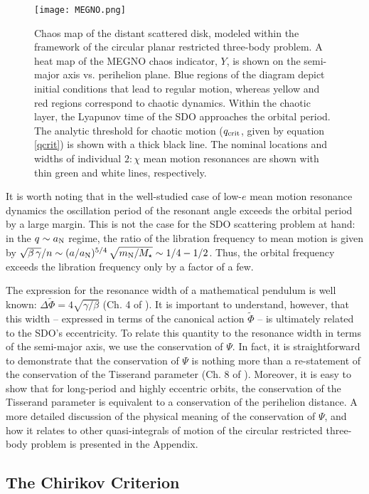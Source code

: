 \documentclass[twocolumn]{aastex62}
\newcommand{\M}{M_{\star}}
\newcommand{\mn}{m_{\rm{N}}}
\newcommand{\an}{a_{\rm{N}}}
\begin{document}
\begin{figure*}[t]
\centering
\texttt{[image: MEGNO.png]}
\caption{Chaos map of the distant scattered disk, modeled within the framework of the circular planar restricted three-body problem. A heat map of the MEGNO chaos indicator, $Y$, is shown on the semi-major axis vs. perihelion plane. Blue regions of the diagram depict initial conditions that lead to regular motion, whereas yellow and red regions correspond to chaotic dynamics. Within the chaotic layer, the Lyapunov time of the SDO approaches the orbital period. The analytic threshold for chaotic motion ($q_{\rm{crit}}$, given by equation \ref{qcrit}) is shown with a thick black line. The nominal locations and widths of individual $2:\chi$ mean motion resonances are shown with thin green and white lines, respectively.}
\label{Fig:MEGNO}
\end{figure*}

It is worth noting that in the well-studied case of low-$e$ mean motion resonance dynamics \citep{MD99,Morbybook} the oscillation period of the resonant angle exceeds the orbital period by a large margin. This is not the case for the SDO scattering problem at hand: in the $q\sim \an$ regime, the ratio of the libration frequency to mean motion is given by $\sqrt{\beta\,\gamma}/n\sim (a/\an)^{5/4}\,\sqrt{\mn/\M}\sim1/4-1/2$. Thus, the orbital frequency exceeds the libration frequency only by a factor of a few.

The expression for the resonance width of a mathematical pendulum is well known: $\Delta\tilde{\Phi}=4\sqrt{\gamma/\beta}$ (Ch. 4 of \citealt{Morbybook}). It is important to understand, however, that this width -- expressed in terms of the canonical action $\tilde{\Phi}$ -- is ultimately related to the SDO's eccentricity. To relate this quantity to the resonance width in terms of the semi-major axis, we use the conservation of $\Psi$. In fact, it is straightforward to demonstrate that the conservation of $\Psi$ is nothing more than a re-statement of the conservation of the Tisserand parameter (Ch. 8 of \citealt{MD99,2013A&A...556A..28B}). Moreover, it is easy to show that for long-period and highly eccentric orbits, the conservation of the Tisserand parameter is equivalent to a conservation of the perihelion distance. A more detailed discussion of the physical meaning of the conservation of $\Psi$, and how it relates to other quasi-integrals of motion of the circular restricted three-body problem is presented in the Appendix.

\subsection{The Chirikov Criterion} \label{sec:chirikov}
\end{document}
